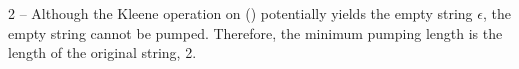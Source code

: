 2 -- Although the Kleene operation on () potentially yields the empty string $\epsilon$, the empty string cannot be pumped. Therefore, the minimum pumping length is the length of the original string, 2.